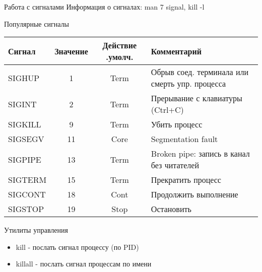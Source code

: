 \begin{frame}[fragile]{Работа с сигналами}
  \small Информация о сигналах: \alert{man 7 signal}, \alert{kill -l}
  \begin{block}{Популярные сигналы}
    \tiny
    \begin{tabular}{l|c|c|l}
      Сигнал & Значение & Действие
      .умолч.& Комментарий \\ \hline 
      SIGHUP &    1     &  Term   &  Обрыв соед. терминала или смерть упр. процесса \\
      SIGINT &    2     &  Term   & Прерывание с клавиатуры (Ctrl+C) \\
      SIGKILL &   9     &  Term   & Убить процесс \\
      SIGSEGV &   11    &  Core   & Segmentation fault \\
      SIGPIPE &   13    &  Term   & Broken pipe: запись в канал без читателей\\
      SIGTERM &   15    &  Term   & Прекратить процесс \\
      SIGCONT &   18    &  Cont   & Продолжить выполнение \\
      SIGSTOP &   19    &  Stop   & Остановить 
    \end{tabular}
  \end{block} \pause

  \begin{block}{Утилиты управления}
    \begin{itemize}
      \item \alert{kill} - послать сигнал процессу (по PID)
      \item \alert{killall} - послать сигнал процессам по имени
    \end{itemize}
  \end{block}

\end{frame}
